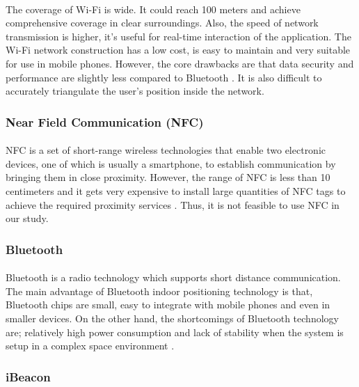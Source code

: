 \documentclass[12pt]{article}
\begin{document}
\paragraph{} The coverage of Wi-Fi is wide. It could reach 100 meters and achieve comprehensive coverage in clear surroundings. Also, the speed of network transmission is higher, it’s useful for real-time interaction of the application. The Wi-Fi network construction has a low cost, is easy to maintain and very suitable for use in mobile phones. However, the core drawbacks are that data security and performance are slightly less compared to Bluetooth \cite{indoor}. It is also difficult to accurately triangulate the user's position inside the network.

\subsubsection{Near Field Communication (NFC)}
\paragraph{}NFC is a set of short-range wireless technologies that enable two electronic devices, one of which is usually a smartphone, to establish communication by bringing them in close proximity. However, the range  of NFC is less than 10 centimeters and it gets very expensive to install large quantities of NFC tags to achieve the required proximity services \cite{tracking}. Thus, it is not feasible to use NFC in our study.

\subsubsection{Bluetooth}
\paragraph{}Bluetooth is a radio technology which supports short distance communication. The main advantage of Bluetooth indoor positioning technology is that, Bluetooth chips are small, easy to integrate with mobile phones and even in smaller devices. On the other hand, the shortcomings of Bluetooth technology are;  relatively high power consumption and lack of stability when the system is setup in a complex space environment \cite{indoor}. 

\subsubsection{iBeacon}
\end{document}
